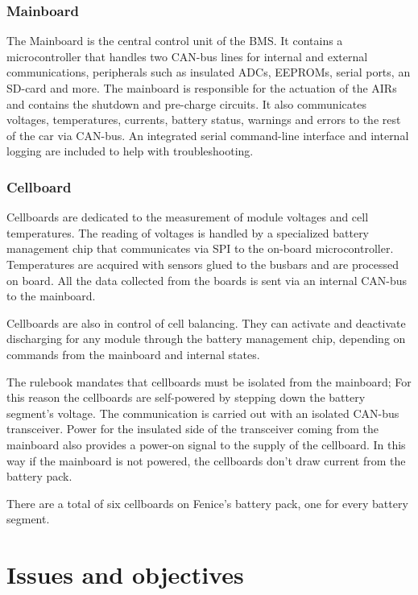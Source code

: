 \subsubsection{Mainboard}
The Mainboard is the central control unit of the BMS. It contains a microcontroller that handles two CAN-bus lines for internal and external communications, peripherals such as insulated ADCs, EEPROMs, serial ports, an SD-card and more. The mainboard is responsible for the actuation of the AIRs and contains the shutdown and pre-charge circuits. It also communicates voltages, temperatures, currents, battery status, warnings and errors to the rest of the car via CAN-bus. An integrated serial command-line interface and internal logging are included to help with troubleshooting.

\subsubsection{Cellboard}
Cellboards are dedicated to the measurement of module voltages and cell temperatures. The reading of voltages is handled by a specialized battery management chip that communicates via SPI to the on-board microcontroller. Temperatures are acquired with sensors glued to the busbars and are processed on board. All the data collected from the boards is sent via an internal CAN-bus to the mainboard.

Cellboards are also in control of cell balancing. They can activate and deactivate discharging for any module through the battery management chip, depending on commands from the mainboard and internal states.

The rulebook mandates that cellboards must be isolated from the mainboard; For this reason the cellboards are self-powered by stepping down the battery segment's voltage. The communication is carried out with an isolated CAN-bus transceiver. Power for the insulated side of the transceiver coming from the mainboard also provides a power-on signal to the supply of the cellboard. In this way if the mainboard is not powered, the cellboards don't draw current from the battery pack.

There are a total of six cellboards on Fenice's battery pack, one for every battery segment.

\section{Issues and objectives}
